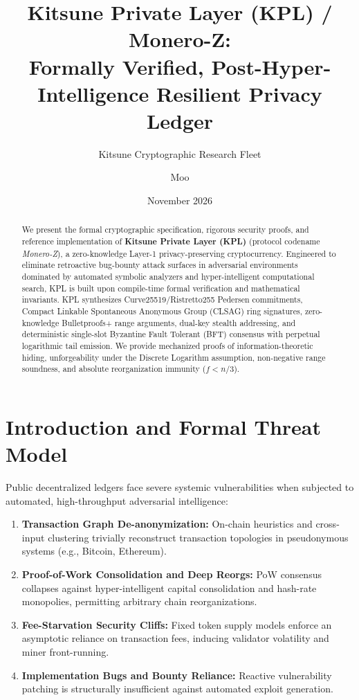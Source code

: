 \documentclass[11pt,a4paper]{article}
\title{\textbf{Kitsune Private Layer (KPL) / Monero-Z:}\\
\large Formally Verified, Post-Hyper-Intelligence Resilient Privacy Ledger}
\author{Kitsune Cryptographic Research Fleet \and Moo}
\date{November 2026}
\begin{document}
\maketitle

\begin{abstract}
We present the formal cryptographic specification, rigorous security proofs, and reference implementation of \textbf{Kitsune Private Layer (KPL)} (protocol codename \textit{Monero-Z}), a zero-knowledge Layer-1 privacy-preserving cryptocurrency. Engineered to eliminate retroactive bug-bounty attack surfaces in adversarial environments dominated by automated symbolic analyzers and hyper-intelligent computational search, KPL is built upon compile-time formal verification and mathematical invariants. KPL synthesizes Curve25519/Ristretto255 Pedersen commitments, Compact Linkable Spontaneous Anonymous Group (CLSAG) ring signatures, zero-knowledge Bulletproofs+ range arguments, dual-key stealth addressing, and deterministic single-slot Byzantine Fault Tolerant (BFT) consensus with perpetual logarithmic tail emission. We provide mechanized proofs of information-theoretic hiding, unforgeability under the Discrete Logarithm assumption, non-negative range soundness, and absolute reorganization immunity ($f < n/3$).
\end{abstract}

\section{Introduction and Formal Threat Model}

Public decentralized ledgers face severe systemic vulnerabilities when subjected to automated, high-throughput adversarial intelligence:
\begin{enumerate}
    \item \textbf{Transaction Graph De-anonymization:} On-chain heuristics and cross-input clustering trivially reconstruct transaction topologies in pseudonymous systems (e.g., Bitcoin, Ethereum).
    \item \textbf{Proof-of-Work Consolidation and Deep Reorgs:} PoW consensus collapses against hyper-intelligent capital consolidation and hash-rate monopolies, permitting arbitrary chain reorganizations.
    \item \textbf{Fee-Starvation Security Cliffs:} Fixed token supply models enforce an asymptotic reliance on transaction fees, inducing validator volatility and miner front-running.
    \item \textbf{Implementation Bugs and Bounty Reliance:} Reactive vulnerability patching is structurally insufficient against automated exploit generation.
\end{enumerate}
\end{document}
